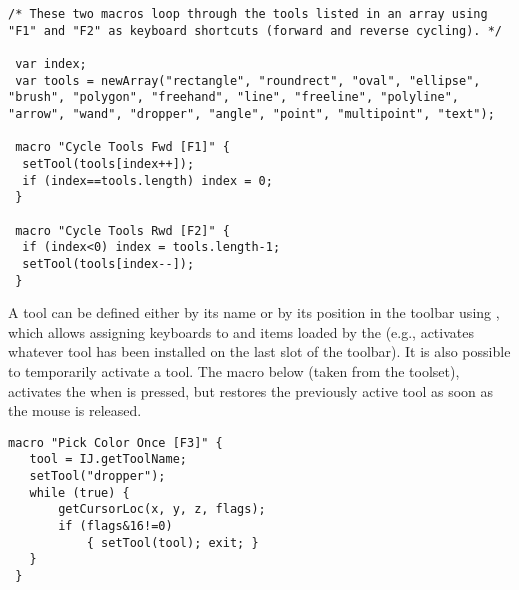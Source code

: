 \begin{lstlisting}[caption={[Cycling Through the Toolbar Using Keyboard Shortcuts]Cycling Through the Toolbar Using Keyboard
Shortcuts},label={lis:toolsShrtct2},showstringspaces=false,tabsize=4]
/* These two macros loop through the tools listed in an array using "F1" and "F2" as keyboard shortcuts (forward and reverse cycling). */

 var index;
 var tools = newArray("rectangle", "roundrect", "oval", "ellipse", "brush", "polygon", "freehand", "line", "freeline", "polyline", "arrow", "wand", "dropper", "angle", "point", "multipoint", "text");

 macro "Cycle Tools Fwd [F1]" {
  setTool(tools[index++]);
  if (index==tools.length) index = 0; 
 } 
   
 macro "Cycle Tools Rwd [F2]" {
  if (index<0) index = tools.length-1;
  setTool(tools[index--]);
 }
\end{lstlisting}


A tool can be defined either by its name or by its position in the
toolbar using ,
which allows assigning keyboards to 
and items loaded by the  (e.g., 
activates whatever tool has been installed on the last slot of the
toolbar). It is also possible to temporarily activate a tool. The
macro below (taken from the 
toolset), activates the  when 
is pressed, but restores the previously active tool as soon as the
mouse is released.

\begin{lstlisting}[caption={Temporary Activation of a Tool},label={lis:toolsShrtct3},showstringspaces=false,tabsize=4]
 macro "Pick Color Once [F3]" {
   tool = IJ.getToolName; 
   setTool("dropper");
   while (true) {
       getCursorLoc(x, y, z, flags);
       if (flags&16!=0)
           { setTool(tool); exit; }
   }
 }
\end{lstlisting}

